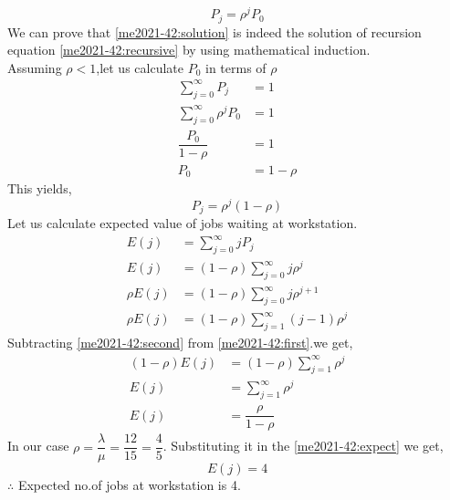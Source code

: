 \begin{equation}
    P_j=\rho^j P_0 \label{me2021-42:solution}
\end{equation}
We can prove that \eqref{me2021-42:solution} is indeed the solution of recursion equation \eqref{me2021-42:recursive} by using mathematical induction.\\
Assuming $\rho<1$,let us calculate $P_0$ in terms of $\rho$
\begin{align}
    \sum_{j=0}^{\infty}P_j&=1\\
    \sum_{j=0}^{\infty}\rho^j P_0 &=1\\
    \dfrac{P_0}{1-\rho}&=1\\
    P_0&=1-\rho
\end{align}
This yields,\\
\begin{equation}
    P_j=\rho^j(1-\rho)
\end{equation}
Let us calculate expected value of jobs waiting at workstation.
\begin{align}
    E(j)&=\sum_{j=0}^{\infty}jP_j\\
    E(j)&=(1-\rho)\sum_{j=0}^{\infty}j\rho^j\label{me2021-42:first}\\
    \rho E(j)&=(1-\rho)\sum_{j=0}^{\infty}j\rho^{j+1}\\
    \rho E(j)&=(1-\rho)\sum_{j=1}^{\infty}(j-1)\rho^{j}\label{me2021-42:second}
\end{align}
Subtracting \eqref{me2021-42:second} from \eqref{me2021-42:first}.we get,
\begin{align}
    (1-\rho)E(j)&=(1-\rho)\sum_{j=1}^{\infty}\rho^j\\
    E(j)&=\sum_{j=1}^{\infty}\rho^j\\
    E(j)&=\dfrac{\rho}{1-\rho}\label{me2021-42:expect}
\end{align}
In our case $\rho=\dfrac{\lambda}{\mu}=\dfrac{12}{15}=\dfrac{4}{5}$. Substituting it in the \eqref{me2021-42:expect} we get,\\
\begin{equation}
    E(j)=4
\end{equation}
$\therefore$ Expected no.of jobs at workstation is 4.